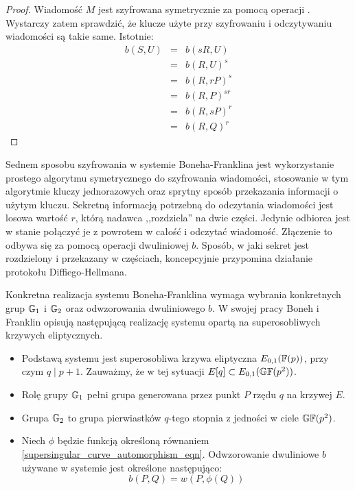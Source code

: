 \begin{proof}
Wiadomość $M$ jest szyfrowana symetrycznie za pomocą operacji .
Wystarczy zatem sprawdzić,
że klucze użyte przy szyfrowaniu i odczytywaniu wiadomości są takie same.
Istotnie:
\begin{eqnarray*}
b(S, U)
& = & b(sR, U) \\
& = & b(R, U)^s \\
& = & b(R, rP)^s \\
& = & b(R, P)^{sr} \\
& = & b(R, sP)^r \\
& = & b(R, Q)^r
\end{eqnarray*}
\end{proof}

\noindent
Sednem sposobu szyfrowania w systemie Boneha-Franklina
jest wykorzystanie prostego algorytmu symetrycznego do szyfrowania wiadomości,
stosowanie w tym algorytmie kluczy jednorazowych
oraz sprytny sposób przekazania informacji o użytym kluczu.
Sekretną informacją potrzebną do odczytania wiadomości
jest losowa wartość $r$, którą nadawca ,,rozdziela'' na dwie części.
Jedynie odbiorca jest w stanie połączyć je z powrotem w całość
i odczytać wiadomość.
Złączenie to odbywa się za pomocą operacji dwuliniowej $b$.
Sposób, w jaki sekret jest rozdzielony i przekazany w częściach,
koncepcyjnie przypomina działanie protokołu Diffiego-Hellmana.

\noindent
Konkretna realizacja systemu Boneha-Franklina
wymaga wybrania konkretnych grup $\mathbb{G}_1$ i $\mathbb{G}_2$
oraz odwzorowania dwuliniowego $b$.
W swojej pracy Boneh i Franklin opisują następującą realizację systemu
opartą na superosobliwych krzywych eliptycznych.
\begin{itemize}
\item
Podstawą systemu jest superosobliwa krzywa eliptyczna $E_{0,1}(\mathbb{F}(p))$,
przy czym $q \mid p+1$.
Zauważmy, że w tej sytuacji $E[q] \subset E_{0,1}(\mathbb{GF}(p^2))$.
\item
Rolę grupy $\mathbb{G}_1$ pełni grupa generowana
przez punkt $P$ rzędu $q$ na krzywej $E$.
\item
Grupa $\mathbb{G}_2$ to grupa pierwiastków $q$-tego stopnia z jedności
w ciele $\mathbb{GF}(p^2)$.
\item
Niech $\phi$ będzie funkcją określoną
równaniem \ref{supersingular_curve_automorphism_eqn}.
Odwzorowanie dwuliniowe $b$ używane w systemie
jest określone następująco:
\begin{equation*}
b(P, Q) = w(P, \phi(Q))
\end{equation*}
\end{itemize}

